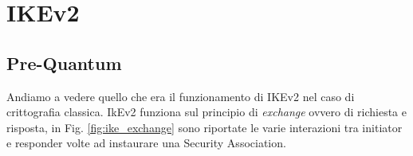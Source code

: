 \newcommand{\drawkey}[3]{
    \draw[line width=0.07cm, draw=#2] (#1) circle [radius=0.15cm];
    \draw[line width=0.07cm, draw=#2] (#1 -0.15) -- ++(0,-0.4);
    \draw[line width=0.07cm, draw=#2] (#1 -0.35) -- ++(-0.2,0);
    \draw[line width=0.07cm, draw=#2] (#1 -0.51) -- ++(-0.2,0);
    \node[below, text=#2] at (#1 -0.6) {#3}
}

\newcommand{\drawcurlybrace}[3]{%
    \draw [decorate,decoration={brace,amplitude=10pt,mirror},xshift=-4pt,yshift=0pt]
    (#1) -- (#2) node [black,midway,xshift=-2cm] {};
}

\chapter{IKEv2}
\label{Chapter2} 

\section{Pre-Quantum}

Andiamo a vedere quello che era il funzionamento di IKEv2 nel caso di crittografia classica.
IkEv2 funziona sul principio di \textit{exchange} ovvero di richiesta e risposta, in Fig. \ref{fig:ike_exchange} sono riportate le varie interazioni tra 
initiator e responder volte ad instaurare una Security Association.

